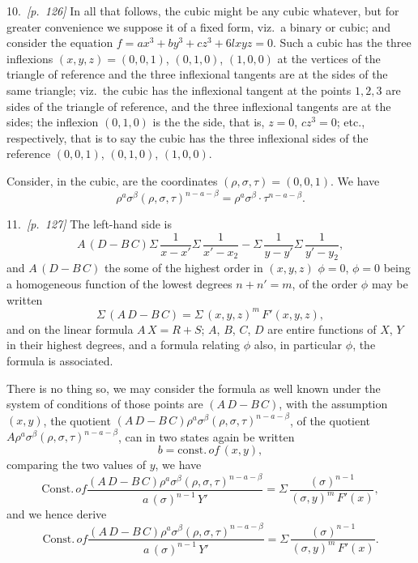 \documentclass[11pt,a4paper]{article}
\theoremstyle{plain}
\theoremstyle{definition}
\theoremstyle{remark}
\begin{document}
10.\ \textit{[p.~126]} In all that follows, the cubic might be any cubic whatever, but for greater convenience we suppose it of a fixed form, viz.\ a binary or cubic; and consider the equation $f = ax^3 + by^3 + cz^3 + 6lxyz = 0$. Such a cubic has the three inflexions $(x, y, z) = (0, 0, 1)$, $(0, 1, 0)$, $(1, 0, 0)$ at the vertices of the triangle of reference and the three inflexional tangents are at the sides of the same triangle; viz.\ the cubic has the inflexional tangent at the points $1, 2, 3$ are sides of the triangle of reference, and the three inflexional tangents are at the sides; the inflexion $(0, 1, 0)$ is the the side, that is, $z = 0$, $cz^3 = 0$; etc., respectively, that is to say the cubic has the three inflexional sides of the reference $(0, 0, 1)$, $(0, 1, 0)$, $(1, 0, 0)$.

Consider, in the cubic, are the coordinates $(\rho, \sigma, \tau) = (0, 0, 1)$. We have
\[
\rho^a \sigma^\beta (\rho, \sigma, \tau)^{n - a - \beta} = \rho^a \sigma^\beta \cdot \tau^{n - a - \beta}.
\]

11.\ \textit{[p.~127]} The left-hand side is
\[
A\,(D - B\,C)\Sigma\,\frac{1}{x - x'}\Sigma\,\frac{1}{x' - x_2} - \Sigma\,\frac{1}{y - y'}\Sigma\,\frac{1}{y' - y_2},
\]
and $A\,(D - B\,C)$ the some of the highest order in $(x, y, z)$ $\phi = 0$, $\phi = 0$ being a homogeneous function of the lowest degrees $n + n' = m$, of the order $\phi$ may be written
\[
\Sigma\,(A\,D - B\,C) = \Sigma\,(x, y, z)^{m}\,F'(x, y, z),
\]
and on the linear formula $A\,X = R + S$; $A$, $B$, $C$, $D$ are entire functions of $X$, $Y$ in their highest degrees, and a formula relating $\phi$ also, in particular $\phi$, the formula is associated.

There is no thing so, we may consider the formula as well known under the system of conditions of those points are $(A\,D - B\,C)$, with the assumption $(x, y)$, the quotient $(A\,D - B\,C)\rho^a \sigma^\beta (\rho, \sigma, \tau)^{n - a - \beta}$, of the quotient $A\rho^a \sigma^\beta (\rho, \sigma, \tau)^{n - a - \beta}$, can in two states again be written
\[
b = \text{const.}\,of\,(x, y),
\]
comparing the two values of $y$, we have
\[
\text{Const.}\,of\frac{(A\,D - B\,C)\rho^a \sigma^\beta (\rho, \sigma, \tau)^{n - a - \beta}}{a\,(\sigma)^{n - 1}\,Y'} = \Sigma\,\frac{(\sigma)^{n - 1}}{(\sigma, y)^{m}\,F'(x)},
\]
and we hence derive
\[
\text{Const.}\,of\frac{(A\,D - B\,C)\rho^a \sigma^\beta (\rho, \sigma, \tau)^{n - a - \beta}}{a\,(\sigma)^{n - 1}\,Y'} = \Sigma\,\frac{(\sigma)^{n - 1}}{(\sigma, y)^{m}\,F'(x)}.
\]
\end{document}
